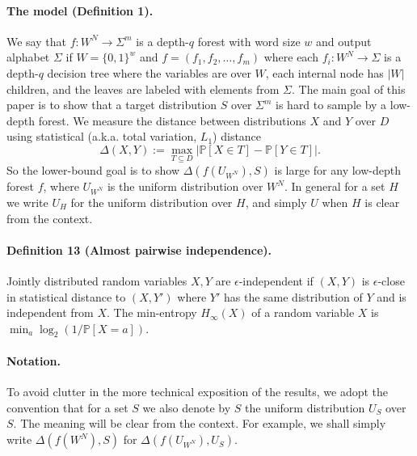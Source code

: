 \paragraph{The model (Definition 1).}
We say that $f:W^N\to\Sigma^m$ is a depth-$q$ forest with word size $w$ and output alphabet $\Sigma$ if $W=\{0,1\}^w$ and $f=(f_1,f_2,\ldots,f_m)$ where each $f_i:W^N\to\Sigma$ is a depth-$q$ decision tree where the variables are over $W$, each internal node has $|W|$ children, and the leaves are labeled with elements from $\Sigma$.
The main goal of this paper is to show that a target distribution $S$ over $\Sigma^m$ is hard to sample by a low-depth forest. We measure the distance between distributions $X$ and $Y$ over $D$ using statistical (a.k.a. total variation, $L_1$) distance
\[\Delta(X,Y):=\max_{T\subseteq D}|\mathbb P[X\in T]-\mathbb P[Y\in T]|.\]
So the lower-bound goal is to show $\Delta(f(U_{W^N}),S)$ is large for any low-depth forest $f$, where $U_{W^N}$ is the uniform distribution over $W^N$. In general for a set $H$ we write $U_H$ for the uniform distribution over $H$, and simply $U$ when $H$ is clear from the context.
\paragraph{Definition 13 (Almost pairwise independence).}
Jointly distributed random variables $X,Y$ are $\epsilon$-independent if $(X,Y)$ is $\epsilon$-close in statistical distance to $(X,Y')$ where $Y'$ has the same distribution of $Y$ and is independent from $X$.
The min-entropy $H_\infty(X)$ of a random variable $X$ is $\min_a\log_2(1/\mathbb P[X=a])$.
\paragraph{Notation.}
To avoid clutter in the more technical exposition of the results, we adopt the convention that for a set $S$ we also denote by $S$ the uniform distribution $U_S$ over $S$. The meaning will be clear from the context. For example, we shall simply write $\Delta(f(W^N),S)$ for $\Delta(f(U_{W^N}),U_S)$.
